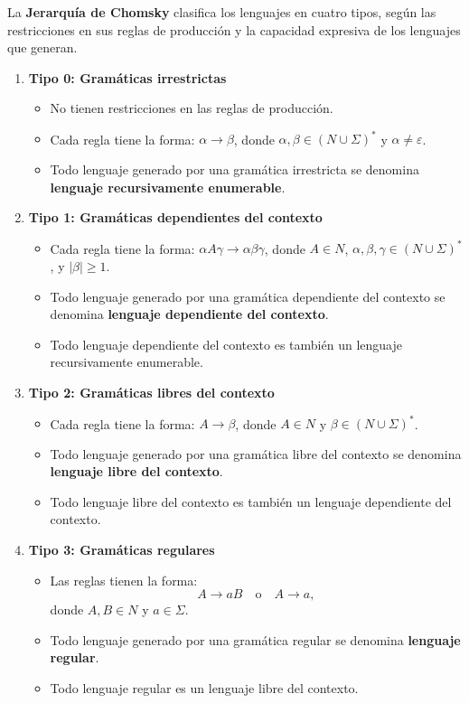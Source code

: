 La \textbf{Jerarquía de Chomsky} clasifica los lenguajes en cuatro tipos, según las restricciones en sus reglas de producción y la capacidad expresiva de los lenguajes que generan.

\begin{enumerate}
  \item \textbf{Tipo 0: Gramáticas irrestrictas}
        \begin{itemize}
          \item No tienen restricciones en las reglas de producción.
          \item Cada regla tiene la forma: \(\alpha \to \beta\), donde \(\alpha, \beta \in (N \cup \Sigma)^*\) y \(\alpha \neq \varepsilon\).
          \item Todo lenguaje generado por una gramática irrestricta se denomina \textbf{lenguaje recursivamente enumerable}.
        \end{itemize}
        
  \item \textbf{Tipo 1: Gramáticas dependientes del contexto}
        \begin{itemize}
          \item Cada regla tiene la forma: \(\alpha A \gamma \to \alpha \beta \gamma\), donde \(A \in N\), \(\alpha, \beta, \gamma \in (N \cup \Sigma)^*\), y \(|\beta| \geq 1\).
          \item Todo lenguaje generado por una gramática dependiente del contexto se denomina \textbf{lenguaje dependiente del contexto}.
          \item Todo lenguaje dependiente del contexto es también un lenguaje recursivamente enumerable.
        \end{itemize}
        
  \item \textbf{Tipo 2: Gramáticas libres del contexto}
        \begin{itemize}
          \item Cada regla tiene la forma: \(A \to \beta\), donde \(A \in N\) y \(\beta \in (N \cup \Sigma)^*\).
          \item Todo lenguaje generado por una gramática libre del contexto se denomina \textbf{lenguaje libre del contexto}.
          \item Todo lenguaje libre del contexto es también un lenguaje dependiente del contexto.
        \end{itemize}
        
  \item \textbf{Tipo 3: Gramáticas regulares}
        \begin{itemize}
          \item Las reglas tienen la forma:
                \[
                  A \to aB \quad \text{o} \quad A \to a,
                \]
                donde \(A, B \in N\) y \(a \in \Sigma\).
          \item Todo lenguaje generado por una gramática regular se denomina \textbf{lenguaje regular}.
          \item Todo lenguaje regular es un lenguaje libre del contexto.
        \end{itemize}
\end{enumerate}

